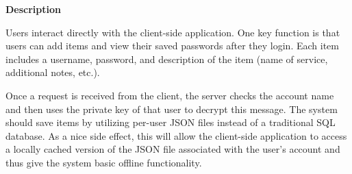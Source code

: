 \documentclass[11pt, letterpaper]{article}
\newcommand{\ProposalSection}[1]
{\noindent\textbf{#1}}
\begin{document}
\ProposalSection{Description}

Users interact directly with the client-side application. One key function is that users can add items and view their saved passwords after they login. Each item includes a username, password, and description of the item (name of service, additional notes, etc.).

Once a request is received from the client, the server checks the account name and then uses the private key of that user to decrypt this message. The system should save items by utilizing per-user JSON files instead of a traditional SQL database. As a nice side effect, this will allow the client-side application to access a locally cached version of the JSON file associated with the user’s account and thus give the system basic offline functionality.
\end{document}
